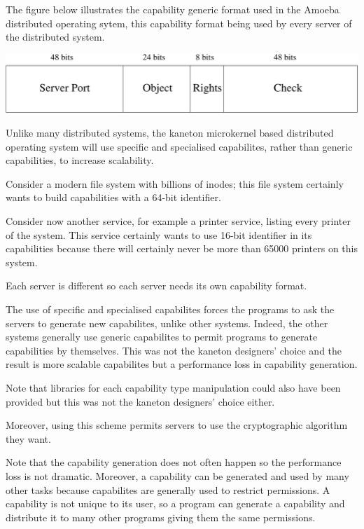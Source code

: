 {\begin{multicols}{2}
The figure below illustrates the capability generic format used in the Amoeba
distributed operating sytem, this capability format being used by every
server of the distributed system.

\begin{center}
  \includegraphics[scale=0.35]{figures/capability.pdf}
\end{center}

Unlike many distributed systems, the kaneton microkernel based
distributed operating system will use specific and specialised capabilites,
rather than generic capabilities, to increase scalability.

Consider a modern file system with billions of inodes; this file system
certainly wants to build capabilities with a 64-bit identifier.

Consider now another service, for example a printer service, listing
every printer of the system. This service certainly wants to use 16-bit
identifier in its capabilities because there will certainly never be more
than 65000 printers on this system.

Each server is different so each server needs its own capability format.

The use of specific and specialised capabilites forces the programs to ask
the servers to generate new capabilites, unlike other systems. Indeed,
the other systems generally use generic capabilites to permit programs to
generate capabilities by themselves. This was not the kaneton designers'
choice and the result is more scalable capabilites but a performance loss
in capability generation.

Note that libraries for each capability type manipulation could also have
been provided but this was not the kaneton designers' choice either.

Moreover, using this scheme permits servers to use the cryptographic
algorithm they want.

Note that the capability generation does not often happen so the performance
loss is not dramatic. Moreover, a capability can be generated and used
by many other tasks because capabilites are generally used to restrict
permissions. A capability is not unique to its user, so a program can
generate a capability and distribute it to many other programs giving
them the same permissions.


\end{multicols}}
